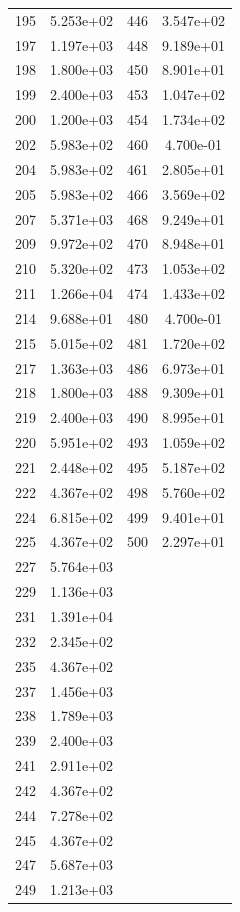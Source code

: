 \documentclass[12pt]{article}
\begin{document}
\begin{longtable}{@{}cccc@{}}
195 & 5.253e+02 & 446 & 3.547e+02 \\
197 & 1.197e+03 & 448 & 9.189e+01 \\
198 & 1.800e+03 & 450 & 8.901e+01 \\
199 & 2.400e+03 & 453 & 1.047e+02 \\
200 & 1.200e+03 & 454 & 1.734e+02 \\
202 & 5.983e+02 & 460 & 4.700e-01 \\
204 & 5.983e+02 & 461 & 2.805e+01 \\
205 & 5.983e+02 & 466 & 3.569e+02 \\
207 & 5.371e+03 & 468 & 9.249e+01 \\
209 & 9.972e+02 & 470 & 8.948e+01 \\
210 & 5.320e+02 & 473 & 1.053e+02 \\
211 & 1.266e+04 & 474 & 1.433e+02 \\
214 & 9.688e+01 & 480 & 4.700e-01 \\
215 & 5.015e+02 & 481 & 1.720e+02 \\
217 & 1.363e+03 & 486 & 6.973e+01 \\
218 & 1.800e+03 & 488 & 9.309e+01 \\
219 & 2.400e+03 & 490 & 8.995e+01 \\
220 & 5.951e+02 & 493 & 1.059e+02 \\
221 & 2.448e+02 & 495 & 5.187e+02 \\
222 & 4.367e+02 & 498 & 5.760e+02 \\
224 & 6.815e+02 & 499 & 9.401e+01 \\
225 & 4.367e+02 & 500 & 2.297e+01 \\
227 & 5.764e+03 &  &  \\
229 & 1.136e+03 &  &  \\
231 & 1.391e+04 &  &  \\
232 & 2.345e+02 &  &  \\
235 & 4.367e+02 &  &  \\
237 & 1.456e+03 &  &  \\
238 & 1.789e+03 &  &  \\
239 & 2.400e+03 &  &  \\
241 & 2.911e+02 &  &  \\
242 & 4.367e+02 &  &  \\
244 & 7.278e+02 &  &  \\
245 & 4.367e+02 &  &  \\
247 & 5.687e+03 &  &  \\
249 & 1.213e+03 &  &  \\

\end{longtable}
\end{document}
